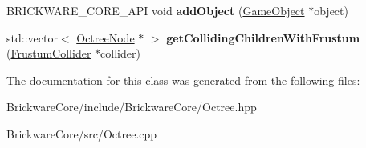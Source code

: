 \begin{DoxyCompactItemize}
\item 
\hypertarget{classBrickware_1_1Core_1_1OctreeNode_ab1eb1fdd2947ebbb3c5f9b03e00e1b60}{}B\+R\+I\+C\+K\+W\+A\+R\+E\+\_\+\+C\+O\+R\+E\+\_\+\+A\+P\+I void {\bfseries add\+Object} (\hyperlink{classBrickware_1_1Core_1_1GameObject}{Game\+Object} $\ast$object)\label{classBrickware_1_1Core_1_1OctreeNode_ab1eb1fdd2947ebbb3c5f9b03e00e1b60}

\item 
\hypertarget{classBrickware_1_1Core_1_1OctreeNode_a37db22331417a6069ef0d2fc5f4b76bd}{}std\+::vector$<$ \hyperlink{classBrickware_1_1Core_1_1OctreeNode}{Octree\+Node} $\ast$ $>$ {\bfseries get\+Colliding\+Children\+With\+Frustum} (\hyperlink{classBrickware_1_1Core_1_1FrustumCollider}{Frustum\+Collider} $\ast$collider)\label{classBrickware_1_1Core_1_1OctreeNode_a37db22331417a6069ef0d2fc5f4b76bd}

\end{DoxyCompactItemize}


The documentation for this class was generated from the following files\+:\begin{DoxyCompactItemize}
\item 
Brickware\+Core/include/\+Brickware\+Core/Octree.\+hpp\item 
Brickware\+Core/src/Octree.\+cpp\end{DoxyCompactItemize}
